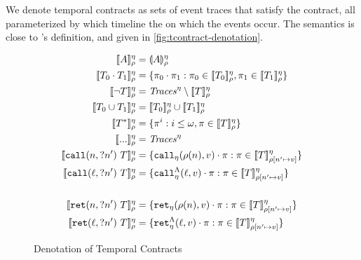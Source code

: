 \documentclass[preprint,onecolumn,9pt]{sigplanconf} %
\begin{document}
We denote temporal contracts as sets of event traces that satisfy the contract, all parameterized by which timeline the on which the events occur.
%
The semantics is close to \citeauthor{ianjohnson:dfm:icfp2011}'s definition, and given in \autoref{fig:tcontract-denotation}.
%
\begin{figure}
  \begin{align*}
   \denotetcon{\mevent}{\mtimeline}{\menv} &=
   \denoteevent{\mevent}{\menv}{\mtimeline}
\\
   \denotetcon{\stseq{\mtcon_0}{\mtcon_1}}{\mtimeline}{\menv} &=
   \setbuild{\mtrace_0 \cdot \mtrace_1}{\mtrace_0 \in \denotetcon{\mtcon_0}{\mtimeline}{\menv}, \mtrace_1 \in \denotetcon{\mtcon_1}{\mtimeline}{\menv}}
\\   
   \denotetcon{\stnot{\mtcon}}{\mtimeline}{\menv} &=
   \Traces^\mtimeline \setminus \denotetcon{\mtcon}{\mtimeline}{\menv}
\\
   \denotetcon{\stOr{\mtcon_0}{\mtcon_1}}{\mtimeline}{\menv} &=
   \denotetcon{\mtcon_0}{\mtimeline}{\menv} \cup \denotetcon{\mtcon_1}{\mtimeline}{\menv}
\\
   \denotetcon{\stmany{\mtcon}}{\mtimeline}{\menv} &=
   \setbuild{\mtrace^i}{i \le \omega, \mtrace \in \denotetcon{\mtcon}{\mtimeline}{\menv}}
\\
   \denotetcon{\sddd}{\mtimeline}{\menv} &=
   \Traces^\mtimeline
\\
   \denotetcon{\stcall{\mname}{\mname'}{\mtcon}}{\mtimeline}{\menv} &=
   \setbuild{\apvcall{\menv(\mname)}{\mval}{\mtimeline}\cdot \mtrace}{\mtrace \in \denotetcon{\mtcon}{\mtimeline}{\menv[\mname' \mapsto \mval]}}
\\
   \denotetcon{\stcall{\mtoplevelname}{\mname'}{\mtcon}}{\mtimeline}{\menv} &=
   \setbuild{\aptopcall{\mtoplevelname}{\mval}{\mtimeline}\cdot \mtrace}{\mtrace \in \denotetcon{\mtcon}{\mtimeline}{\menv[\mname' \mapsto \mval]}}
\\
\\
   \denotetcon{\stret{\mname}{\mname'}{\mtcon}}{\mtimeline}{\menv} &=
   \setbuild{\apvret{\menv(\mname)}{\mval}{\mtimeline}\cdot \mtrace}{\mtrace \in \denotetcon{\mtcon}{\mtimeline}{\menv[\mname' \mapsto \mval]}}
\\
   \denotetcon{\stret{\mtoplevelname}{\mname'}{\mtcon}}{\mtimeline}{\menv} &=
   \setbuild{\aptopret{\mtoplevelname}{\mval}{\mtimeline}\cdot \mtrace}{\mtrace \in \denotetcon{\mtcon}{\mtimeline}{\menv[\mname' \mapsto \mval]}}
  \end{align*}
  \caption{Denotation of Temporal Contracts}
  \label{fig:tcontract-denotation}
\end{figure}
\end{document}
